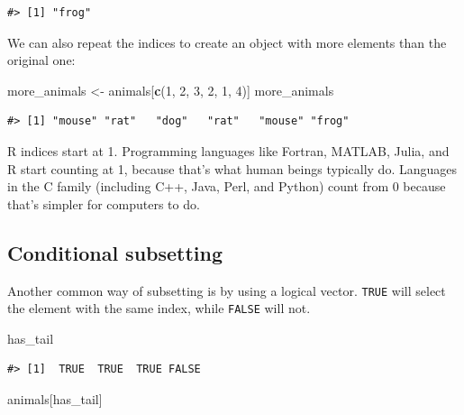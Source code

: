 \documentclass[
]{book}
\newenvironment{Shaded}{\begin{snugshade}}{\end{snugshade}}
\newcommand{\DecValTok}[1]{\textcolor[rgb]{0.00,0.00,0.81}{#1}}
\newcommand{\KeywordTok}[1]{\textcolor[rgb]{0.13,0.29,0.53}{\textbf{#1}}}
\newcommand{\NormalTok}[1]{#1}
\newcommand{\StringTok}[1]{\textcolor[rgb]{0.31,0.60,0.02}{#1}}
\begin{document}
\begin{verbatim}
#> [1] "frog"
\end{verbatim}

We can also repeat the indices to create an object with more elements than the
original one:

\begin{Shaded}
\begin{Highlighting}[]
\NormalTok{more_animals <-}\StringTok{ }\NormalTok{animals[}\KeywordTok{c}\NormalTok{(}\DecValTok{1}\NormalTok{, }\DecValTok{2}\NormalTok{, }\DecValTok{3}\NormalTok{, }\DecValTok{2}\NormalTok{, }\DecValTok{1}\NormalTok{, }\DecValTok{4}\NormalTok{)]}
\NormalTok{more_animals}
\end{Highlighting}
\end{Shaded}

\begin{verbatim}
#> [1] "mouse" "rat"   "dog"   "rat"   "mouse" "frog"
\end{verbatim}

R indices start at 1. Programming languages like Fortran, MATLAB, Julia, and R start
counting at 1, because that's what human beings typically do. Languages in the C
family (including C++, Java, Perl, and Python) count from 0 because that's
simpler for computers to do.

\hypertarget{conditional-subsetting}{%
\subsection{Conditional subsetting}\label{conditional-subsetting}}

Another common way of subsetting is by using a logical vector. \texttt{TRUE} will
select the element with the same index, while \texttt{FALSE} will not.

\begin{Shaded}
\begin{Highlighting}[]
\NormalTok{has_tail}
\end{Highlighting}
\end{Shaded}

\begin{verbatim}
#> [1]  TRUE  TRUE  TRUE FALSE
\end{verbatim}

\begin{Shaded}
\begin{Highlighting}[]
\NormalTok{animals[has_tail]}
\end{Highlighting}
\end{Shaded}
\end{document}
